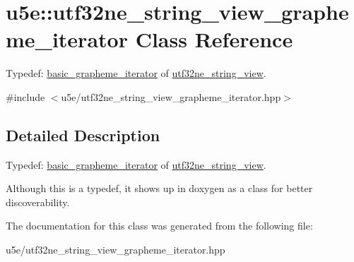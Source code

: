 \hypertarget{classu5e_1_1utf32ne__string__view__grapheme__iterator}{}\section{u5e\+:\+:utf32ne\+\_\+string\+\_\+view\+\_\+grapheme\+\_\+iterator Class Reference}
\label{classu5e_1_1utf32ne__string__view__grapheme__iterator}


Typedef\+: \hyperlink{classu5e_1_1basic__grapheme__iterator}{basic\+\_\+grapheme\+\_\+iterator} of \hyperlink{classu5e_1_1utf32ne__string__view}{utf32ne\+\_\+string\+\_\+view}.  




{\ttfamily \#include $<$u5e/utf32ne\+\_\+string\+\_\+view\+\_\+grapheme\+\_\+iterator.\+hpp$>$}



\subsection{Detailed Description}
Typedef\+: \hyperlink{classu5e_1_1basic__grapheme__iterator}{basic\+\_\+grapheme\+\_\+iterator} of \hyperlink{classu5e_1_1utf32ne__string__view}{utf32ne\+\_\+string\+\_\+view}. 

Although this is a typedef, it shows up in doxygen as a class for better discoverability. 

The documentation for this class was generated from the following file\+:\begin{DoxyCompactItemize}
\item 
u5e/utf32ne\+\_\+string\+\_\+view\+\_\+grapheme\+\_\+iterator.\+hpp\end{DoxyCompactItemize}
